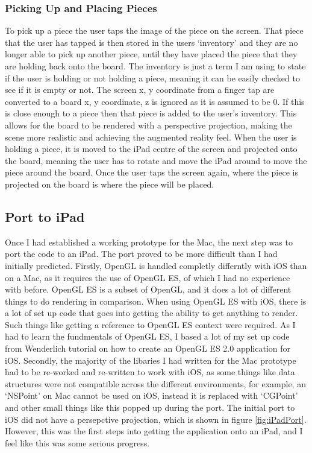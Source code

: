 \documentclass{article}
\begin{document}
\subsubsection{Picking Up and Placing Pieces}
To pick up a piece the user taps the image of the piece on the screen. That
piece that the user has tapped is then stored in the users `inventory' and they
are no longer able to pick up another piece, until they have placed the piece
that they are holding back onto the board. The inventory is just a term I am
using to state if the user is holding or not holding a piece, meaning it can be
easily checked to see if it is empty or not. The screen x, y coordinate from a
finger tap are converted to a board x, y coordinate, z is ignored as it is
assumed to be 0. If this is close enough to a piece then that piece is added to
the user's inventory. This allows for the board to be rendered with a
perspective projection, making the scene more realistic and achieving the
augmented reality feel. When the user is holding a piece, it is moved to the
iPad centre of the screen and projected onto the board, meaning the user has to
rotate and move the iPad around to move the piece around the board. Once the
user taps the screen again, where the piece is projected on the board is where
the piece will be placed.

\subsection{Port to iPad}
Once I had established a working prototype for the Mac, the next step was to
port the code to an iPad. The port proved to be more difficult than I had
initially predicted. Firstly, OpenGL is handled completly differntly with iOS
than on a Mac, as it requires the use of OpenGL ES, of which I had no experience
with before. OpenGL ES is a subset of OpenGL, and it does a lot of different
things to do rendering in comparison. When using OpenGL ES with iOS, there is a
lot of set up code that goes into getting the ability to get anything to
render. Such things like getting a reference to OpenGL ES context were
required. As I had to learn the fundmentals of OpenGL ES, I based a lot of my
set up code from Wenderlich tutorial \cite{ref:RayOpenGL} on how to create an
OpenGL ES 2.0 application for iOS. Secondly, the majority of the libaries I had
written for the Mac prototype had to be re-worked and re-written to work with
iOS, as some things like data structures were not compatible across the
different environments, for example, an `NSPoint' on Mac cannot be used on iOS,
instead it is replaced with `CGPoint' and other small things like this popped up
during the port. The initial port to iOS did not have a persepctive projection,
which is shown in figure \ref{fig:iPadPort}. However, this was the first steps
into getting the application onto an iPad, and I feel like this was some serious
progress.
\end{document}
